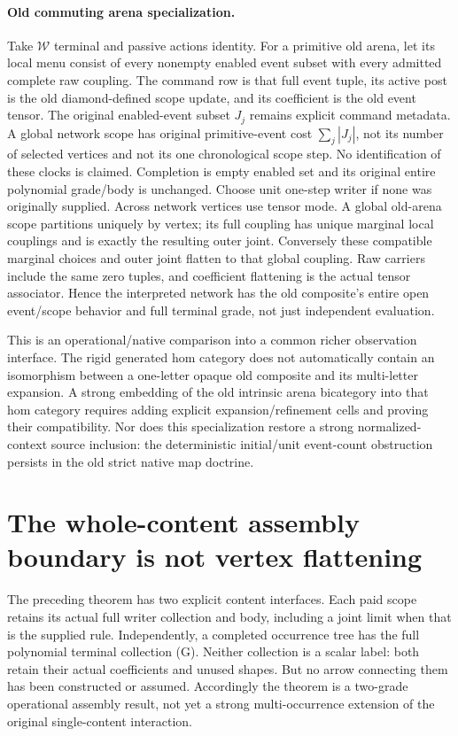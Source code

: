 \documentclass[11pt]{article}
\begin{document}
\paragraph{Old commuting arena specialization.}
Take $\mathcal W$ terminal and passive actions identity. For a primitive old arena, let its local menu consist of every nonempty enabled event subset with every admitted complete raw coupling. The command row is that full event tuple, its active post is the old diamond-defined scope update, and its coefficient is the old event tensor. The original enabled-event subset $J_j$ remains explicit command metadata. A global network scope has original primitive-event cost $\sum_j|J_j|$, not its number of selected vertices and not its one chronological scope step. No identification of these clocks is claimed. Completion is empty enabled set and its original entire polynomial grade/body is unchanged. Choose unit one-step writer if none was originally supplied. Across network vertices use tensor mode. A global old-arena scope partitions uniquely by vertex; its full coupling has unique marginal local couplings and is exactly the resulting outer joint. Conversely these compatible marginal choices and outer joint flatten to that global coupling. Raw carriers include the same zero tuples, and coefficient flattening is the actual tensor associator. Hence the interpreted network has the old composite's entire open event/scope behavior and full terminal grade, not just independent evaluation.

This is an operational/native comparison into a common richer observation interface. The rigid generated hom category does not automatically contain an isomorphism between a one-letter opaque old composite and its multi-letter expansion. A strong embedding of the old intrinsic arena bicategory into that hom category requires adding explicit expansion/refinement cells and proving their compatibility. Nor does this specialization restore a strong normalized-context source inclusion: the deterministic initial/unit event-count obstruction persists in the old strict native map doctrine.

\section{The whole-content assembly boundary is not vertex flattening}
The preceding theorem has two explicit content interfaces. Each paid scope retains its actual full writer collection and body, including a joint limit when that is the supplied rule. Independently, a completed occurrence tree has the full polynomial terminal collection (G). Neither collection is a scalar label: both retain their actual coefficients and unused shapes. But no arrow connecting them has been constructed or assumed. Accordingly the theorem is a two-grade operational assembly result, not yet a strong multi-occurrence extension of the original single-content interaction.
\end{document}
